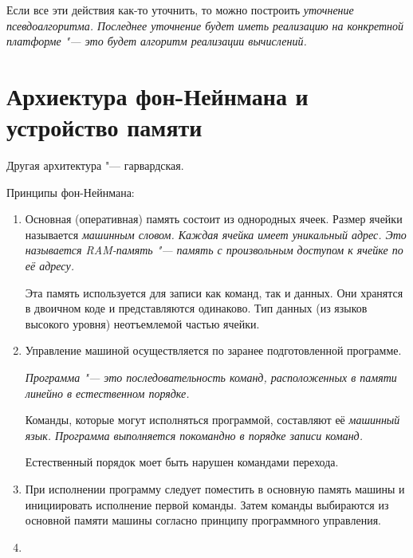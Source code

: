 Если все эти действия как-то уточнить, то можно построить \it{уточнение псевдоалгоритма}. Последнее уточнение будет иметь реализацию на конкретной платформе "--- это будет алгоритм реализации вычислений.

\section{Архиектура фон-Нейнмана и устройство памяти}

Другая архитектура "--- гарвардская.

Принципы фон-Нейнмана:
\begin{enumerate}
	\item {}

	Основная (оперативная) память состоит из однородных ячеек. Размер ячейки называется \it{машинным словом}. Каждая ячейка имеет уникальный адрес. Это называется RAM-память "--- память с произвольным доступом к ячейке по её адресу.

	Эта память используется для записи как команд, так и данных. Они хранятся в двоичном коде и представляются одинаково. Тип данных (из языков высокого уровня)  неотъемлемой частью ячейки.

	\item {}

	Управление машиной осуществляется по заранее подготовленной программе.

	\begin{definition}
		\it{Программа} "--- это последовательность команд, расположенных в памяти линейно в естественном порядке.
	\end{definition}

	Команды, которые могут исполняться программой, составляют её \it{машинный язык}. Программа выполняется покомандно в порядке записи команд.

	Естественный порядок моет быть нарушен командами перехода.

	\item {}

	При исполнении программу следует поместить в основную память машины и инициировать исполнение первой команды. Затем команды выбираются из основной памяти машины согласно принципу программного управления.

	\item {}


\end{enumerate}
